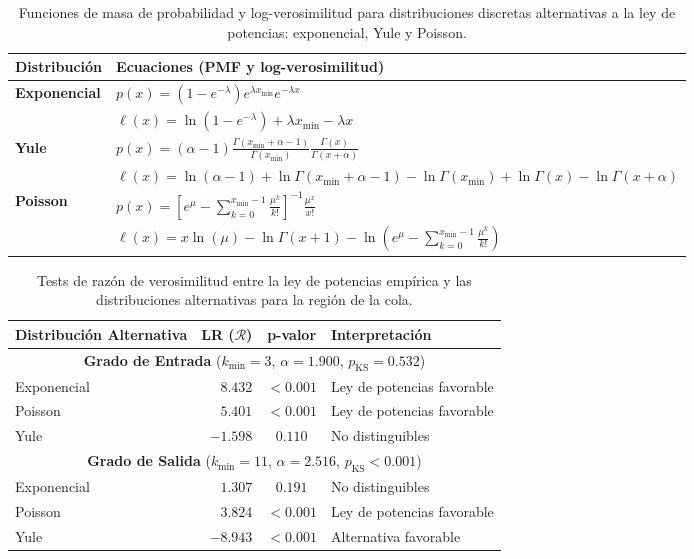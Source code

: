 \documentclass[12pt,a4paper]{report}
\begin{document}
	\begin{table}[H]
		\centering
		\renewcommand{\arraystretch}{2.2} %
		\begin{tabular}{ll}
			\toprule
			\textbf{Distribución} & \textbf{Ecuaciones (PMF y log-verosimilitud)} \\
			\midrule
			\multirow{2}{*}{\textbf{Exponencial}} 
			& $p(x) = (1 - e^{-\lambda}) e^{\lambda x_{\min}} e^{-\lambda x}$ \\
			& $\ell(x) = \ln(1 - e^{-\lambda}) + \lambda x_{\min} - \lambda x$ \\
			\midrule
			\multirow{2}{*}{\textbf{Yule}} 
			& $p(x) = (\alpha - 1) \frac{\Gamma(x_{\min} + \alpha - 1)}{\Gamma(x_{\min})} \frac{\Gamma(x)}{\Gamma(x + \alpha)}$ \\
			& $\ell(x) = \ln(\alpha - 1) + \ln\Gamma(x_{\min} + \alpha - 1) - \ln\Gamma(x_{\min}) + \ln\Gamma(x) - \ln\Gamma(x + \alpha)$ \\
			\midrule
			\multirow{2}{*}{\textbf{Poisson}} 
			& $p(x) = \left[ e^{\mu} - \sum_{k=0}^{x_{\min}-1} \frac{\mu^k}{k!} \right]^{-1} \frac{\mu^x}{x!}$ \\
			& $\ell(x) = x \ln(\mu) - \ln\Gamma(x + 1) - \ln\left( e^{\mu} - \sum_{k=0}^{x_{\min}-1} \frac{\mu^k}{k!} \right)$ \\
			\bottomrule
		\end{tabular}
		\caption{Funciones de masa de probabilidad y log-verosimilitud para distribuciones discretas alternativas a la ley de potencias: exponencial, Yule y Poisson.}
		\label{tab:dist_alternativas}
	\end{table}
	
	\begin{table}[H]
		\centering
		\begin{tabular}{lrcl}
			\toprule
			\textbf{Distribución Alternativa} & \textbf{LR ($\mathcal{R}$)} & \textbf{p-valor} & \textbf{Interpretación} \\
			\midrule
			\multicolumn{4}{c}{\textbf{Grado de Entrada} \quad ($k_{\min}=3$, $\alpha=1.900$, $p_{\text{KS}}=0.532$)} \\
			\midrule
			Exponencial & $8.432$ & $<0.001$ & Ley de potencias favorable \\
			Poisson     & $5.401$ & $<0.001$ & Ley de potencias favorable \\
			Yule        & $-1.598$ & $0.110$ & No distinguibles \\
			\midrule
			\multicolumn{4}{c}{\textbf{Grado de Salida} \quad ($k_{\min}=11$, $\alpha=2.516$, $p_{\text{KS}}<0.001$)} \\
			\midrule
			Exponencial & $1.307$ & $0.191$ & No distinguibles \\
			Poisson     & $3.824$ & $<0.001$ & Ley de potencias favorable \\
			Yule        & $-8.943$ & $<0.001$ & Alternativa favorable \\
			\bottomrule
		\end{tabular}
		\caption{Tests de razón de verosimilitud entre la ley de potencias empírica y las distribuciones alternativas para la región de la cola.}
		\label{tab:likelihood_ratio_test}
	\end{table}
\end{document}
